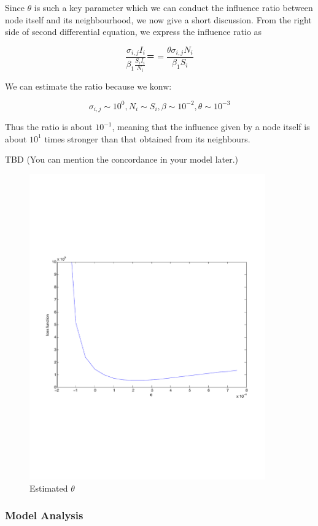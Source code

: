 \documentclass[11pt]{article}
\begin{document}
Since $\theta$ is such a key parameter which we can conduct the influence ratio between node itself and its neighbourhood, we now give a short discussion. From the right side of second differential equation, we express the influence ratio as

$$
\frac{\sigma_{i,j} I_i}{\beta_1 \frac{S_i I_i}{N_i} } ＝ =  \frac{\theta \sigma_{i,j} N_i}{\beta_1 S_i}
$$

We can estimate the ratio because we konw:

$$
\sigma_{i,j} \sim 10^0, N_i \sim S_i, \beta \sim 10^{-2}, \theta \sim 10^{-3}
$$

Thus the ratio is about $10^{-1}$, meaning that the influence given by a node itself is about $10^1$ times stronger than that obtained from its neighbours.

TBD
(You can mention the concordance in your model later.)


\begin{figure}[hbt]
\begin{center}
  \includegraphics[width=4in]{graph/est3.pdf}
  \caption{Estimated $\theta$}
  \label{est}
\end{center}  
\end{figure}

\label{eth}

\subsubsection{Model Analysis}
\end{document}
